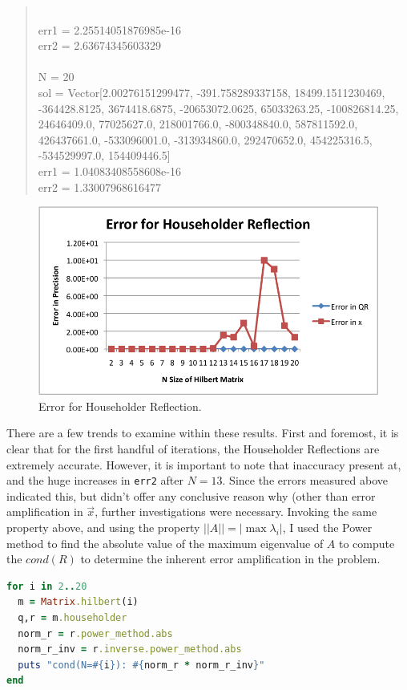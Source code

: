 \documentclass[letterpaper,12pt]{article}
\begin{document}
\begin{quote}
\\err1 = 2.25514051876985e-16
\\err2 = 2.63674345603329
\\
\\N = 20
\\sol = Vector[2.00276151299477, -391.758289337158, 18499.1511230469, -364428.8125, 3674418.6875, -20653072.0625, 65033263.25, -100826814.25, 24646409.0, 77025627.0, 218001766.0, -800348840.0, 587811592.0, 426437661.0, -533096001.0, -313934860.0, 292470652.0, 454225316.5, -534529997.0, 154409446.5]
\\err1 = 1.04083408558608e-16
\\err2 = 1.33007968616477
\end{quote}

\begin{figure}[H]
  \centering
  \includegraphics{householder.png}
  \caption{\label{householder}Error for Householder Reflection.}
\end{figure} 

There are a few trends to examine within these results.
First and foremost, it is clear that for the first handful of iterations, the
Householder Reflections are extremely accurate.
However, it is important to note that inaccuracy present at, and the huge
increases in \texttt{err2} after $N =13$.
Since the errors measured above indicated this, but didn't offer any conclusive
reason why (other than error amplification in $\vec{x}$, further investigations
were necessary.
Invoking the same property above, and using the property $||A|| = |\max{\lambda_i}|$,
I used the Power method to find the absolute value of the maximum eigenvalue of
$A$ to compute the $cond(R)$ to determine the inherent error amplification in the
problem.

\lstset{caption=Determining cond(R) for Householder}
\begin{lstlisting}[language=ruby]
for i in 2..20
  m = Matrix.hilbert(i)
  q,r = m.householder
  norm_r = r.power_method.abs
  norm_r_inv = r.inverse.power_method.abs
  puts "cond(N=#{i}): #{norm_r * norm_r_inv}"
end
\end{lstlisting}
\end{document}
